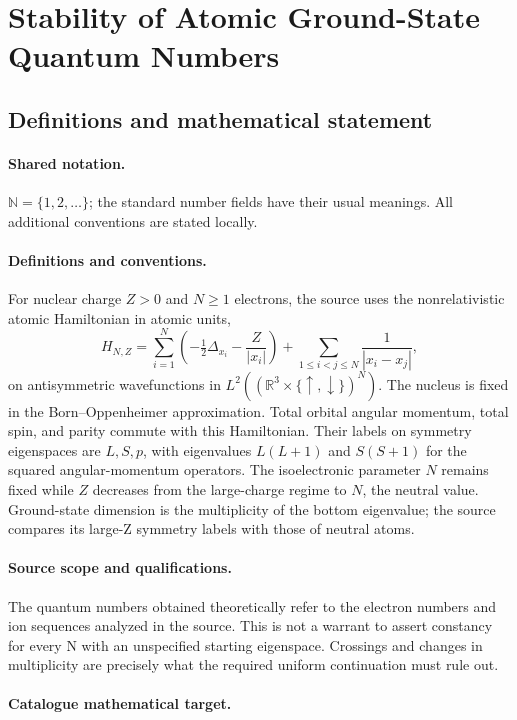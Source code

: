\documentclass[11pt]{article}
\begin{document}
\section{Stability of Atomic Ground-State Quantum Numbers}\label{statement}

\subsection{Definitions and mathematical statement}

\paragraph{Shared notation.}$\mathbb N=\{1,2,\ldots\}$; the standard number fields have their usual meanings. All additional conventions are stated locally.


\paragraph{Definitions and conventions.} For nuclear charge $Z>0$ and $N\ge1$ electrons, the source uses the nonrelativistic atomic Hamiltonian in atomic units,
\[
H_{N,Z}=\sum_{i=1}^N\left(-\tfrac12\Delta_{x_i}-\frac{Z}{|x_i|}\right)+
\sum_{1\le i<j\le N}\frac1{|x_i-x_j|},
\]
on antisymmetric wavefunctions in $L^2((\mathbb R^3\times\{\uparrow,\downarrow\})^N)$. The nucleus is fixed in the Born--Oppenheimer approximation. Total orbital angular momentum, total spin, and parity commute with this Hamiltonian. Their labels on symmetry eigenspaces are $L,S,p$, with eigenvalues $L(L+1)$ and $S(S+1)$ for the squared angular-momentum operators. The isoelectronic parameter $N$ remains fixed while $Z$ decreases from the large-charge regime to $N$, the neutral value. Ground-state dimension is the multiplicity of the bottom eigenvalue; the source compares its large-Z symmetry labels with those of neutral atoms.

\paragraph{Source scope and qualifications.} The quantum numbers obtained theoretically refer to the electron numbers and ion sequences analyzed in the source. This is not a warrant to assert constancy for every N with an unspecified starting eigenspace. Crossings and changes in multiplicity are precisely what the required uniform continuation must rule out.

\paragraph{Catalogue mathematical target.}
\end{document}
